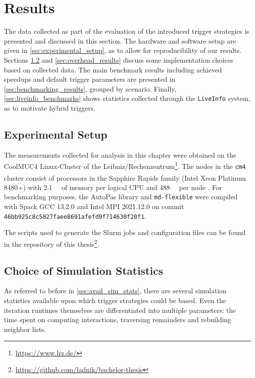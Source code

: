 \chapter[Results]{Results}
\label{cp:results}

{
	\parindent0pt
	The data collected as part of the evaluation of the introduced trigger strategies is presented and discussed in this section. The hardware and software setup are given in \autoref{sec:experimental_setup}, as to allow for reproducibility of our results. Sections \ref{sec:justification_rebuild} and \ref{sec:overhead_results} discuss some implementation choices based on collected data. The main benchmark results including achieved speedups and default trigger parameters are presented in \autoref{sec:benchmarking_results}, grouped by scenario. Finally, \autoref{sec:liveinfo_benchmarks} shows statistics collected through the \texttt{LiveInfo} system, as to motivate hybrid triggers.
}


\section{Experimental Setup}
\label{sec:experimental_setup}
The measurements collected for analysis in this chapter were obtained on the CoolMUC4 Linux-Cluster of the Leibniz\-/Rechenzentrum\footnote{\href{https://www.lrz.de/}{https://www.lrz.de/}}. The nodes in the \texttt{cm4} cluster consist of processors in the Sapphire Rapids family (Intel\textsuperscript{\textregistered} Xeon\textsuperscript{\textregistered} Platinum 8480+)  with \qty{2.1}{\gibi \byte} of memory per logical CPU and \qty{488}{\gibi \byte} per node \cite{LSC2025}. For benchmarking purposes, the AutoPas library and \texttt{md-flexible} were compiled with  Spack GCC 13.2.0 and Intel MPI 2021.12.0 on commit \texttt{46bb925c8c5827faee8691afefd9f714630f20f1}.

The scripts used to generate the Slurm jobs and configuration files can be found in the repository of this thesis\footnote{\href{https://github.com/ladnik/bachelor-thesis}{https://github.com/ladnik/bachelor-thesis}}.


\section{Choice of Simulation Statistics}
\label{sec:justification_rebuild}
As referred to before in \autoref{sec:avail_sim_stats}, there are several simulation statistics available upon which trigger strategies could be based. Even the iteration runtimes themselves are differentiated into multiple parameters: the time spent on computing interactions, traversing remainders and rebuilding neighbor lists.


